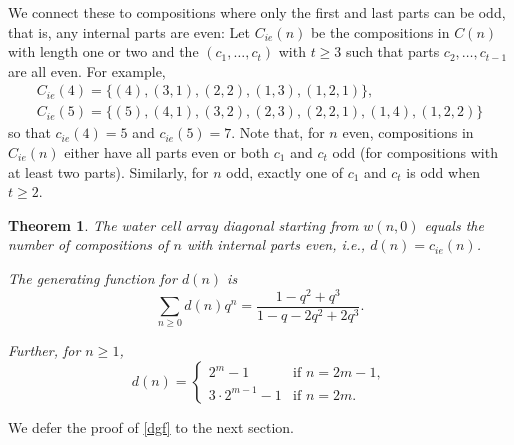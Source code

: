 \documentclass[]{interact}
\theoremstyle{plain}
\numberwithin{equation}{section} %
\newtheorem{theorem}[thm]{Theorem}
\numberwithin{table}{section} %
\numberwithin{figure}{section}
\begin{document}
We connect these to compositions where only the first and last parts can be odd, that is, any internal parts are even: Let $C_{ie}(n)$ be the compositions in $C(n)$ with length one or two and the $(c_1, \ldots, c_t)$ with $t \ge 3$ such that parts $c_2, \ldots, c_{t-1}$ are all even.
For example,
\begin{gather*}
C_{ie}(4) = \{(4),(3,1),(2,2),(1,3),(1,2,1)\}, \\ C_{ie}(5) = \{(5),(4,1),(3,2),(2,3),(2,2,1),(1,4),(1,2,2)\}
\end{gather*}
so that $c_{ie}(4) = 5$ and $c_{ie}(5) = 7$.  Note that, for $n$ even, compositions in $C_{ie}(n)$ either have all parts even or both $c_1$ and $c_t$ odd (for compositions with at least two parts).  Similarly, for $n$ odd, exactly one of $c_1$ and $c_t$ is odd when $t \ge 2$.

\begin{theorem} \label{dp}
The water cell array diagonal starting from $w(n,0)$ equals the number of compositions of $n$ with internal parts even, i.e., $d(n) = c_{ie}(n)$. 

The generating function for $d(n)$ is
\begin{equation}
 \sum_{n \ge 0} d(n) q^n = \frac{1-q^2+q^3}{1 - q - 2 q^2 + 2 q^3}. \label{dgf}
 \end{equation}

Further, for $n \ge 1$,
\begin{equation}
d(n) = \begin{cases} 2^m - 1 & \text{if $n = 2m-1$}, \\ 3\cdot 2^{m-1} - 1 & \text{if $n = 2m$}. \end{cases} \label{df}
\end{equation}
\end{theorem}

We defer the proof of \eqref{dgf} to the next section.
\end{document}
